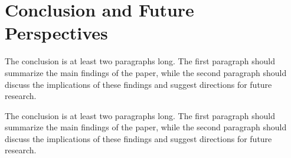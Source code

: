 \documentclass[conference]{IEEEtran}
\begin{document}
\section{Conclusion and Future Perspectives} \label{cap:conclusion}
The conclusion is at least two paragraphs long. The first paragraph should summarize the main findings of the paper, while the second paragraph should discuss the implications of these findings and suggest directions for future research.

The conclusion is at least two paragraphs long. The first paragraph should summarize the main findings of the paper, while the second paragraph should discuss the implications of these findings and suggest directions for future research.



\end{document}

